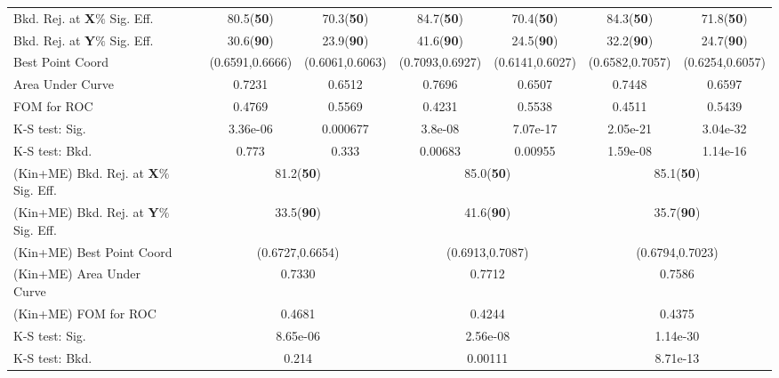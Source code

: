 {\begin{table}[ht!]
{\begin{tabular}{| l | c | c | c | c | c | c | c | c |}
Bkd. Rej. at \textbf{X}$\%$ Sig. Eff. &&& 80.5(\textbf{50}) & 70.3(\textbf{50}) & 84.7(\textbf{50}) & 70.4(\textbf{50}) & 84.3(\textbf{50}) & 71.8(\textbf{50}) \\
Bkd. Rej. at \textbf{Y}$\%$ Sig. Eff. &&& 30.6(\textbf{90}) & 23.9(\textbf{90}) & 41.6(\textbf{90}) & 24.5(\textbf{90}) & 32.2(\textbf{90}) & 24.7(\textbf{90}) \\
Best Point Coord &&& (0.6591,0.6666) & (0.6061,0.6063) & (0.7093,0.6927) & (0.6141,0.6027) & (0.6582,0.7057) & (0.6254,0.6057) \\
Area Under Curve &&& 0.7231 & 0.6512 & 0.7696 & 0.6507 & 0.7448 & 0.6597 \\
FOM for ROC & & & \cellcolor{yellow}0.4769 & \cellcolor{red}0.5569 & 0.4231 & 0.5538 & 0.4511 & 0.5439 \\ \hline
K-S test: Sig. &&& 3.36e-06 & 0.000677 & 3.8e-08 & 7.07e-17 & 2.05e-21 & 3.04e-32 \\
K-S test: Bkd. &&& 0.773 & 0.333 & 0.00683 & 0.00955 & 1.59e-08 & 1.14e-16 \\ \hline
(Kin+ME) Bkd. Rej. at \textbf{X}$\%$ Sig. Eff. & \multicolumn{2}{c|}{} & \multicolumn{2}{c|}{81.2(\textbf{50})} & \multicolumn{2}{c|}{85.0(\textbf{50})} & \multicolumn{2}{c|}{85.1(\textbf{50})} \\
(Kin+ME) Bkd. Rej. at \textbf{Y}$\%$ Sig. Eff. & \multicolumn{2}{c|}{} & \multicolumn{2}{c|}{33.5(\textbf{90})} & \multicolumn{2}{c|}{41.6(\textbf{90})} & \multicolumn{2}{c|}{35.7(\textbf{90})} \\
(Kin+ME) Best Point Coord & \multicolumn{2}{c|}{} & \multicolumn{2}{c|}{(0.6727,0.6654)} & \multicolumn{2}{c|}{(0.6913,0.7087)} & \multicolumn{2}{c|}{(0.6794,0.7023)} \\
(Kin+ME) Area Under Curve & \multicolumn{2}{c|}{} & \multicolumn{2}{c|}{0.7330} & \multicolumn{2}{c|}{0.7712} & \multicolumn{2}{c|}{0.7586} \\
(Kin+ME) FOM for ROC & \multicolumn{2}{c|}{} & \multicolumn{2}{c|}{0.4681} & \multicolumn{2}{c|}{0.4244} & \multicolumn{2}{c|}{0.4375} \\ \hline
K-S test: Sig. &  \multicolumn{2}{c|}{} &  \multicolumn{2}{c|}{8.65e-06} &  \multicolumn{2}{c|}{2.56e-08} &  \multicolumn{2}{c|}{1.14e-30} \\
K-S test: Bkd. & \multicolumn{2}{c|}{} &  \multicolumn{2}{c|}{0.214} &  \multicolumn{2}{c|}{0.00111} &  \multicolumn{2}{c|}{8.71e-13} \\ \hline
    \end{tabular} }
\end{table}
}
